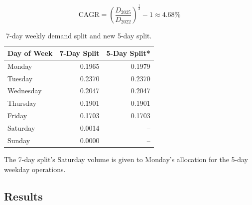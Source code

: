 \documentclass[12pt]{article}
\begin{document}
\begin{equation}\label{eq:postnord_cagr}
  \text{CAGR} = \left( \frac{D_{2025}}{D_{2022}} \right)^{\frac{1}{3}} - 1 \approx 4.68\%
\end{equation}

\begin{table}[htbp]
  \centering
  \caption{7-day weekly demand split \parencite{dailydemand} and new 5-day split.}
  \label{anx:day_shares}

  \begin{tabular}{lrr}
    \toprule
    \textbf{Day of Week} & \textbf{7-Day Split} & \textbf{5-Day Split*} \\
    \midrule
    Monday               & 0.1965               & 0.1979                \\
    Tuesday              & 0.2370               & 0.2370                \\
    Wednesday            & 0.2047               & 0.2047                \\
    Thursday             & 0.1901               & 0.1901                \\
    Friday               & 0.1703               & 0.1703                \\
    Saturday             & 0.0014               & --                    \\
    Sunday               & 0.0000               & --                    \\
    \bottomrule
  \end{tabular}

  \vspace{1ex}
  {\raggedright \footnotesize * The 7-day split's Saturday volume is given to Monday's allocation for the 5-day weekday operations.\par}
\end{table}

\subsection{Results}
\label{subsec:appendix-results}
\end{document}
